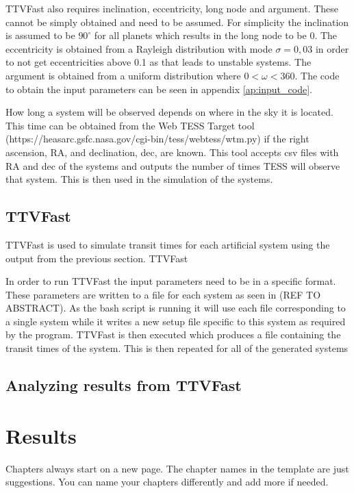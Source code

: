 \documentclass[12pt]{report}
\begin{document}
	TTVFast also requires inclination, eccentricity, long node and argument. These cannot be simply obtained and need to be assumed. For simplicity the inclination is assumed to be $90^{\circ}$ for all planets which results in the long node to be 0. The eccentricity is obtained from a Rayleigh distribution with mode $\sigma = 0,03$ in order to not get eccentricities above 0.1 as that leads to unstable systems. The argument is obtained from a uniform distribution where $0 < \omega < 360$. The code to obtain the input parameters can be seen in appendix \ref{ap:input_code}. 
	
	How long a system will be observed depends on where in the sky it is located. This time can be obtained from the Web TESS Target tool (https://heasarc.gsfc.nasa.gov/cgi-bin/tess/webtess/wtm.py) if the right ascension, RA, and declination, dec, are known. This tool accepts csv files with RA and dec of the systems and outputs the number of times TESS will observe that system. This is then used in the simulation of the systems.
	

\section{TTVFast}
\label{TTVFast_method}
	TTVFast is used to simulate transit times for each artificial system using the output from the previous section. TTVFast 	
	
	
	In order to run TTVFast the input parameters need to be in a specific format. These parameters are written to a file for each system as seen in (REF TO ABSTRACT). As the bash script is running it will use each file corresponding to a single system while it writes a new setup file specific to this system as required by the program. TTVFast is then executed which produces a file containing the transit times of the system. This is then repeated for all of the generated systems 

\section{Analyzing results from TTVFast}



\chapter{Results}

\iffalse Chapters always start on a new page. The chapter names in the template are just
suggestions. You can name your chapters differently and add more if needed.
\end{document}
